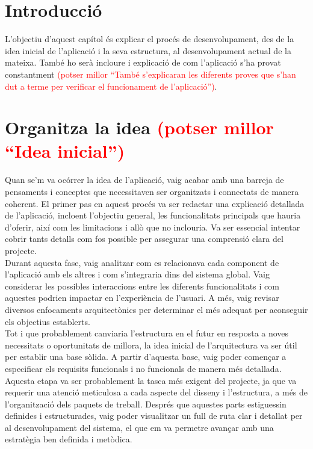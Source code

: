 \documentclass[a4paper,12pt,twoside]{ThesisStyle}
\newcommand{\pau}[1]{\textcolor{red}{#1}}
\begin{document}
\section{Introducció}
\label{sec: Introducció}

L'objectiu d'aquest capítol és explicar el procés de desenvolupament, des de la idea inicial
de l'aplicació i la seva estructura, al desenvolupament actual de la mateixa. També ho serà
incloure i explicació de com l'aplicació s'ha provat constantment \pau{(potser millor ``També s'explicaran les diferents proves que s'han dut a terme per verificar el funcionament de l'aplicació'')}.


\section{Organitza la idea \pau{(potser millor ``Idea inicial'')}}
\label{sec: Organitza la idea}

Quan se'm va ocórrer la idea de l'aplicació, vaig acabar amb una barreja de pensaments i conceptes que necessitaven ser organitzats i connectats de manera coherent. El primer pas en aquest procés va ser redactar una explicació detallada de l'aplicació, incloent l'objectiu general, les funcionalitats principals que hauria d'oferir, així com les limitacions i allò que no inclouria. Va ser essencial intentar cobrir tants detalls com fos possible per assegurar una comprensió clara del projecte.\\

Durant aquesta fase, vaig analitzar com es relacionava cada component de l'aplicació amb els altres i com s'integraria dins del sistema global. Vaig considerar les possibles interaccions entre les diferents funcionalitats i com aquestes podrien impactar en l'experiència de l'usuari. A més, vaig revisar diversos enfocaments arquitectònics per determinar el més adequat per aconseguir els objectius establerts.\\

Tot i que probablement canviaria l'estructura en el futur en resposta a noves necessitats o oportunitats de millora, la idea inicial de l'arquitectura va ser útil per establir una base sòlida. A partir d'aquesta base, vaig poder començar a especificar els requisits funcionals i no funcionals de manera més detallada. Aquesta etapa va ser probablement la tasca més exigent del projecte, ja que va requerir una atenció meticulosa a cada aspecte del disseny i l'estructura, a més de l'organització dels paquets de treball. Després que aquestes parts estiguessin definides i estructurades, vaig poder visualitzar un full de ruta clar i detallat per al desenvolupament del sistema, el que em va permetre avançar amb una estratègia ben definida i metòdica.
\end{document}
